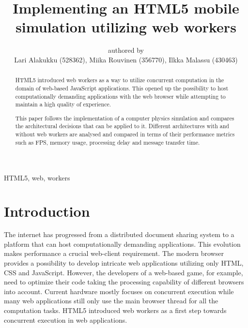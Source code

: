 \documentclass[conference]{IEEEtran}
\begin{document}
\title{Implementing an HTML5 mobile simulation utilizing web workers}

\author{authored by\\
        Lari Alakukku (528362),
        Miika Rouvinen (356770),
        Ilkka Malassu (430463)}%

\makeatletter         
\def\@maketitle{
\begin{center}
{\Huge \bfseries \sffamily \@title }\\[4ex] 
Submitted on \@date\\
{\normalsize \@author}\\[4ex] 
\end{center}}
\makeatother


\maketitle

\begin{IEEEkeywords}
HTML5, web, workers
\end{IEEEkeywords}

\begin{abstract}

HTML5 introduced web workers as a way to utilize concurrent computation in the domain of web-based JavaScript applications. This opened up the possibility to host 
computationally demanding applications with the web browser while attempting to maintain a high quality of experience.

This paper follows the implementation of a computer physics simulation and compares the architectural decisions that can be applied to it. Different architectures with and 
without web workers are analysed and compared in terms of their performance metrics such as FPS, memory usage, processing delay and message transfer time.
 
\end{abstract}

\section{Introduction}
\label{chap:introduction}

The internet has progressed from a distributed document sharing system to a platform that can host computationally demanding applications. This evolution makes performance a crucial web-client requirement. The modern browser provides a possibility to develop intricate web applications utilizing only HTML, CSS and JavaScript. However, the developers of a web-based game, for example, need to optimize their code taking the processing capability of different browsers into account. Current hardware mostly focuses on concurrent execution while many web applications still only use the main browser thread for all the computation tasks. HTML5 introduced web workers as a first step towards concurrent execution in web applications. \cite{doha}
\end{document}
